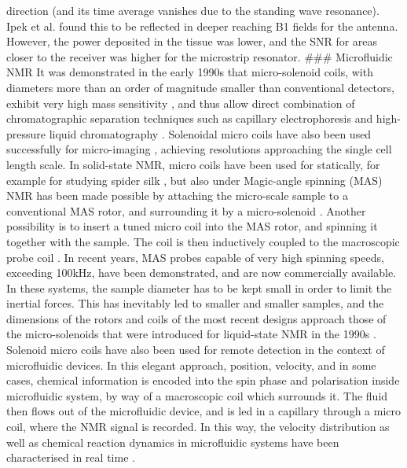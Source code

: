 direction (and its time average vanishes due to the standing wave
resonance). Ipek et al. found this to be reflected in deeper reaching B1
fields for the antenna. However, the power deposited in the tissue was
lower, and the SNR for areas closer to the receiver was higher for the
microstrip resonator. \#\#\# Microfluidic NMR It was demonstrated in the
early 1990s that micro-solenoid coils, with diameters more than an order
of magnitude smaller than conventional detectors, exhibit very high mass
sensitivity \cite{Olson:1995vu,Sweedler1997tl,Lacey1999uu}, and thus allow
direct combination of chromatographic separation techniques such as
capillary electrophoresis \cite{Peck:1994hh,Wu:1994ks,Olson:1999ed} and
high-pressure liquid chromatography \cite{Lacey:2001dr}. Solenoidal micro
coils have also been used successfully for micro-imaging
\cite{Seeber2000iy,Ciobanu:2002wo}, achieving resolutions approaching the
single cell length scale. In solid-state NMR, micro coils have been used
for statically, for example for studying spider silk
\cite{KYamauchi:2005jv}, but also under Magic-angle spinning (MAS) NMR has
been made possible by attaching the micro-scale sample to a conventional
MAS rotor, and surrounding it by a micro-solenoid \cite{Kentgens:2008wu}.
Another possibility is to insert a tuned micro coil into the MAS rotor,
and spinning it together with the sample. The coil is then inductively
coupled to the macroscopic probe coil
\cite{Sakellariou:2007jy,Jacquinot:2011cj}. In recent years, MAS probes
capable of very high spinning speeds, exceeding 100kHz, have been
demonstrated, and are now commercially available. In these systems, the
sample diameter has to be kept small in order to limit the inertial
forces. This has inevitably led to smaller and smaller samples, and the
dimensions of the rotors and coils of the most recent designs approach
those of the micro-solenoids that were introduced for liquid-state NMR
in the 1990s \cite{Samoson:2010et}. Solenoid micro coils have also been
used for remote detection in the context of microfluidic devices. In
this elegant approach, position, velocity, and in some cases, chemical
information is encoded into the spin phase and polarisation inside
microfluidic system, by way of a macroscopic coil which surrounds it.
The fluid then flows out of the microfluidic device, and is led in a
capillary through a micro coil, where the NMR signal is recorded. In
this way, the velocity distribution as well as chemical reaction
dynamics in microfluidic systems have been characterised in real time
\cite{Hilty:2005eq, McDonnell:2005dn,Harel:2007bs, Bouchard:2008hv,
Ledbetter:2008kp,Harel2009eg,Bajaj:2010cy,Telkki:2011go,Telkki2014jf}.


